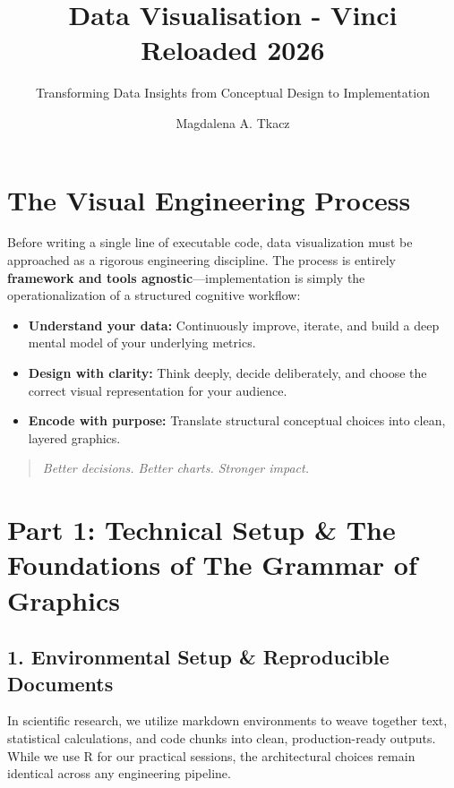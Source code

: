 \documentclass[
]{article}
\title{Data Visualisation - Vinci Reloaded 2026}
\subtitle{Transforming Data Insights from Conceptual Design to
Implementation}
\author{Magdalena A. Tkacz}
\date{}
\providecommand{\tightlist}{%
  \setlength{\itemsep}{0pt}\setlength{\parskip}{0pt}}
\begin{document}
\maketitle

{
\setcounter{tocdepth}{3}
\tableofcontents
}
\section{The Visual Engineering
Process}\label{the-visual-engineering-process}

Before writing a single line of executable code, data visualization must
be approached as a rigorous engineering discipline. The process is
entirely \textbf{framework and tools agnostic}---implementation is
simply the operationalization of a structured cognitive workflow:

\begin{itemize}
\tightlist
\item
  \textbf{Understand your data:} Continuously improve, iterate, and
  build a deep mental model of your underlying metrics.
\item
  \textbf{Design with clarity:} Think deeply, decide deliberately, and
  choose the correct visual representation for your audience.
\item
  \textbf{Encode with purpose:} Translate structural conceptual choices
  into clean, layered graphics.
\end{itemize}

\begin{quote}
\emph{Better decisions. Better charts. Stronger impact.}
\end{quote}

\section{Part 1: Technical Setup \& The Foundations of The Grammar of
Graphics}\label{part-1-technical-setup-the-foundations-of-the-grammar-of-graphics}

\subsection{1. Environmental Setup \& Reproducible
Documents}\label{environmental-setup-reproducible-documents}

In scientific research, we utilize markdown environments to weave
together text, statistical calculations, and code chunks into clean,
production-ready outputs. While we use R for our practical sessions, the
architectural choices remain identical across any engineering pipeline.
\end{document}
